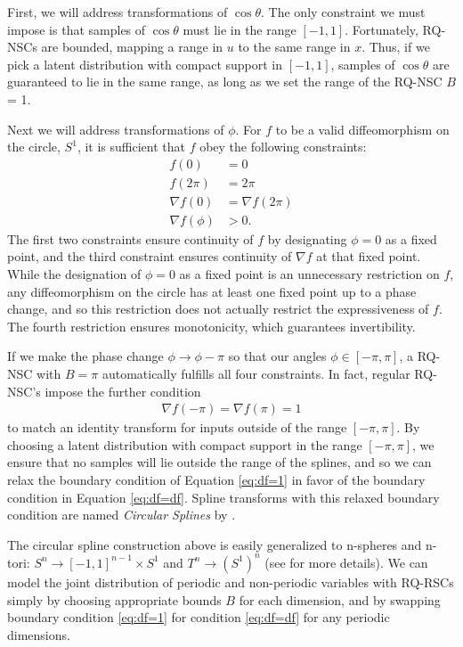 \documentclass[twocolumn]{aastex631}
\begin{document}
First, we will address transformations of $\cos\theta$.
The only constraint we must impose is that samples of $\cos\theta$ must lie in the range $[-1, 1]$.
Fortunately, RQ-NSCs are bounded, mapping a range in $u$ to the same range in $x$.
Thus, if we pick a latent distribution with compact support in $[-1, 1]$, samples of $\cos\theta$ are guaranteed to lie in the same range, as long as we set the range of the RQ-NSC $B$ = 1.

Next we will address transformations of $\phi$.
For $f$ to be a valid diffeomorphism on the circle, $S^1$, it is sufficient that $f$ obey the following constraints:
\begin{align}
    f(0) &= 0 \\
    f(2\pi) &= 2\pi \\
    \nabla f(0) &= \nabla f(2\pi) \label{eq:df=df} \\
    \nabla f(\phi) &> 0.
\end{align}
The first two constraints ensure continuity of $f$ by designating $\phi=0$ as a fixed point, and the third constraint ensures continuity of $\nabla f$ at that fixed point.
While the designation of $\phi=0$ as a fixed point is an unnecessary restriction on $f$, any diffeomorphism on the circle has at least one fixed point up to a phase change, and so this restriction does not actually restrict the expressiveness of $f$.
The fourth restriction ensures monotonicity, which guarantees invertibility.

If we make the phase change $\phi \to \phi - \pi$ so that our angles $\phi \in [-\pi, \pi]$, a RQ-NSC with $B=\pi$ automatically fulfills all four constraints.
In fact, regular RQ-NSC's impose the further condition
\begin{align}
    \nabla f(-\pi) = \nabla f(\pi) = 1 \label{eq:df=1}
\end{align}
to match an identity transform for inputs outside of the range $[-\pi, \pi]$.
By choosing a latent distribution with compact support in the range $[-\pi, \pi]$, we ensure that no samples will lie outside the range of the splines, and so we can relax the boundary condition of Equation \ref{eq:df=1} in favor of the boundary condition in Equation \ref{eq:df=df}.
Spline transforms with this relaxed boundary condition are named \emph{Circular Splines} by \citet{rezende2020}.

The circular spline construction above is easily generalized to n-spheres and n-tori: $S^n \to [-1, 1]^{n-1} \times S^1$ and $T^n \to (S^1)^n$ (see \citealt{rezende2020} for more details).
We can model the joint distribution of periodic and non-periodic variables with RQ-RSCs simply by choosing appropriate bounds $B$ for each dimension, and by swapping boundary condition \ref{eq:df=1} for condition \ref{eq:df=df} for any periodic dimensions.
\end{document}
